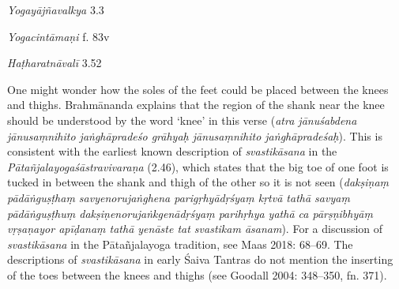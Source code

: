 \begin{ekdosis}
\begin{sources}[hp01_019]
\emph{Yogayājñavalkya} 3.3

\begin{versinnote}
\end{versinnote}

\end{sources}

\begin{testimonia}[hp01_019]
\emph{Yogacintāmaṇi} f. 83v

\begin{versinnote}
\end{versinnote}

\emph{Haṭharatnāvalī} 3.52

\begin{versinnote}
\end{versinnote}

\end{testimonia}

\begin{philcomm}[hp01_019]        
One might wonder how the soles of the feet could be placed between the knees and thighs. Brahmānanda explains that the region of the shank near the knee should be understood by the word ‘knee’ in this verse (\emph{atra jānuśabdena jānusaṃnihito jaṅghāpradeśo grāhyaḥ jānusaṃnihito jaṅghāpradeśaḥ}). This is consistent with the earliest known description of \emph{svastikāsana} in the \emph{Pātañjalayogaśāstravivaraṇa} (2.46), which states that the big toe of one foot is tucked in between the shank and thigh of the other so it is not seen (\emph{dakṣiṇaṃ pādāṅguṣṭhaṃ savyenorujaṅghena parigṛhyādṛśyaṃ kṛtvā tathā savyaṃ pādāṅguṣṭhuṃ dakṣiṇenorujaṅkgenādṛśyaṃ parihṛhya yathā ca pārṣṇibhyāṃ vṛṣaṇayor apīḍanaṃ tathā yenāste tat svastikam āsanam}). For a discussion of \emph{svastikāsana} in the Pātañjalayoga tradition, see Maas 2018: 68–69. The descriptions of \emph{svastikāsana} in early Śaiva Tantras do not mention the inserting of the toes between the knees and thighs (see Goodall 2004: 348–350, fn. 371).
\end{philcomm}


\end{ekdosis}
